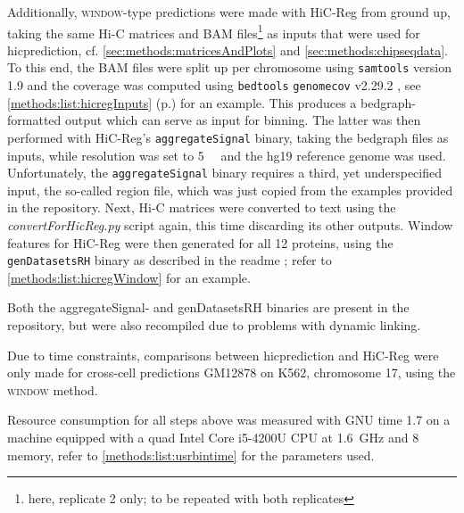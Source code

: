 Additionally, \textsc{window}-type predictions were made with HiC-Reg from ground up,
taking the same Hi-C matrices and BAM files\footnote{here, replicate 2 only; to be repeated with both replicates} 
as inputs that were used for hicprediction, 
cf. \autoref{sec:methods:matricesAndPlots} and \ref{sec:methods:chipseqdata}.
To this end, the BAM files were split up 
per chromosome using \texttt{samtools} \cite{Li2009} version 1.9
and the coverage was computed using \texttt{bedtools} \texttt{genomecov} v2.29.2 \cite{Quinlan2010}, 
see \autoref{methods:list:hicregInputs} (p.\;\pageref{methods:list:hicregInputs}) for an example. 
This produces a bedgraph-formatted output which can serve as input for binning.
The latter was then performed with HiC-Reg's \texttt{aggregateSignal} binary, 
taking the bedgraph files as inputs, while resolution was set to \SI{5}{\kilo\bp} and the hg19 reference genome was used. 
Unfortunately, the \texttt{aggregateSignal} binary requires a third, yet underspecified input, 
the so-called region file, which was just copied from the examples provided in the repository.
Next, Hi-C matrices were converted to text using the \emph{convertForHicReg.py} script again, this time discarding its other outputs.
Window features for HiC-Reg were then generated for all 12 proteins,
using the \texttt{genDatasetsRH} binary as described in the readme \cite{Roy2020}; refer to \autoref{methods:list:hicregWindow} for an example.

Both the aggregateSignal- and genDatasetsRH binaries are present in the repository, 
but were also recompiled due to problems with dynamic linking. 

Due to time constraints, comparisons between hicprediction and HiC-Reg 
were only made for cross-cell predictions GM12878 on K562, chromosome 17,
using the \textsc{window} method.

Resource consumption for all steps above 
was measured with GNU time 1.7 on a machine equipped with a quad Intel{\small\textregistered} Core{\small\texttrademark} i5-4200U CPU at 
\SI{1.6}{\giga\hertz} and \SI{8}{\giga\byte} memory, refer to \autoref{methods:list:usrbintime} for the parameters used.




